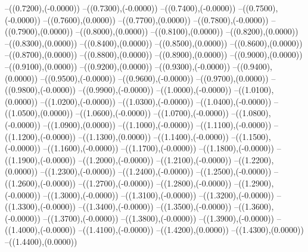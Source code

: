 {	--({\sx*(0.7200)},{\sy*(-0.0000)})
	--({\sx*(0.7300)},{\sy*(-0.0000)})
	--({\sx*(0.7400)},{\sy*(-0.0000)})
	--({\sx*(0.7500)},{\sy*(-0.0000)})
	--({\sx*(0.7600)},{\sy*(0.0000)})
	--({\sx*(0.7700)},{\sy*(0.0000)})
	--({\sx*(0.7800)},{\sy*(-0.0000)})
	--({\sx*(0.7900)},{\sy*(0.0000)})
	--({\sx*(0.8000)},{\sy*(0.0000)})
	--({\sx*(0.8100)},{\sy*(0.0000)})
	--({\sx*(0.8200)},{\sy*(0.0000)})
	--({\sx*(0.8300)},{\sy*(0.0000)})
	--({\sx*(0.8400)},{\sy*(0.0000)})
	--({\sx*(0.8500)},{\sy*(0.0000)})
	--({\sx*(0.8600)},{\sy*(0.0000)})
	--({\sx*(0.8700)},{\sy*(0.0000)})
	--({\sx*(0.8800)},{\sy*(0.0000)})
	--({\sx*(0.8900)},{\sy*(0.0000)})
	--({\sx*(0.9000)},{\sy*(0.0000)})
	--({\sx*(0.9100)},{\sy*(0.0000)})
	--({\sx*(0.9200)},{\sy*(0.0000)})
	--({\sx*(0.9300)},{\sy*(-0.0000)})
	--({\sx*(0.9400)},{\sy*(0.0000)})
	--({\sx*(0.9500)},{\sy*(-0.0000)})
	--({\sx*(0.9600)},{\sy*(-0.0000)})
	--({\sx*(0.9700)},{\sy*(0.0000)})
	--({\sx*(0.9800)},{\sy*(-0.0000)})
	--({\sx*(0.9900)},{\sy*(-0.0000)})
	--({\sx*(1.0000)},{\sy*(-0.0000)})
	--({\sx*(1.0100)},{\sy*(0.0000)})
	--({\sx*(1.0200)},{\sy*(-0.0000)})
	--({\sx*(1.0300)},{\sy*(-0.0000)})
	--({\sx*(1.0400)},{\sy*(-0.0000)})
	--({\sx*(1.0500)},{\sy*(0.0000)})
	--({\sx*(1.0600)},{\sy*(-0.0000)})
	--({\sx*(1.0700)},{\sy*(-0.0000)})
	--({\sx*(1.0800)},{\sy*(-0.0000)})
	--({\sx*(1.0900)},{\sy*(0.0000)})
	--({\sx*(1.1000)},{\sy*(-0.0000)})
	--({\sx*(1.1100)},{\sy*(-0.0000)})
	--({\sx*(1.1200)},{\sy*(-0.0000)})
	--({\sx*(1.1300)},{\sy*(0.0000)})
	--({\sx*(1.1400)},{\sy*(-0.0000)})
	--({\sx*(1.1500)},{\sy*(-0.0000)})
	--({\sx*(1.1600)},{\sy*(-0.0000)})
	--({\sx*(1.1700)},{\sy*(-0.0000)})
	--({\sx*(1.1800)},{\sy*(-0.0000)})
	--({\sx*(1.1900)},{\sy*(-0.0000)})
	--({\sx*(1.2000)},{\sy*(-0.0000)})
	--({\sx*(1.2100)},{\sy*(-0.0000)})
	--({\sx*(1.2200)},{\sy*(0.0000)})
	--({\sx*(1.2300)},{\sy*(-0.0000)})
	--({\sx*(1.2400)},{\sy*(-0.0000)})
	--({\sx*(1.2500)},{\sy*(-0.0000)})
	--({\sx*(1.2600)},{\sy*(-0.0000)})
	--({\sx*(1.2700)},{\sy*(-0.0000)})
	--({\sx*(1.2800)},{\sy*(-0.0000)})
	--({\sx*(1.2900)},{\sy*(-0.0000)})
	--({\sx*(1.3000)},{\sy*(-0.0000)})
	--({\sx*(1.3100)},{\sy*(-0.0000)})
	--({\sx*(1.3200)},{\sy*(-0.0000)})
	--({\sx*(1.3300)},{\sy*(-0.0000)})
	--({\sx*(1.3400)},{\sy*(-0.0000)})
	--({\sx*(1.3500)},{\sy*(-0.0000)})
	--({\sx*(1.3600)},{\sy*(-0.0000)})
	--({\sx*(1.3700)},{\sy*(-0.0000)})
	--({\sx*(1.3800)},{\sy*(-0.0000)})
	--({\sx*(1.3900)},{\sy*(-0.0000)})
	--({\sx*(1.4000)},{\sy*(-0.0000)})
	--({\sx*(1.4100)},{\sy*(-0.0000)})
	--({\sx*(1.4200)},{\sy*(0.0000)})
	--({\sx*(1.4300)},{\sy*(0.0000)})
	--({\sx*(1.4400)},{\sy*(0.0000)})
}
